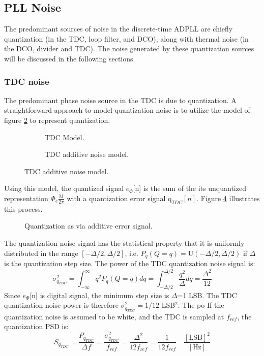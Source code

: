 \subsection{PLL Noise} \label{pn_theory}
The predominant sources of noise in the discrete-time ADPLL are chiefly quantization (in the TDC, loop filter, and DCO), along with thermal noise (in the DCO, divider and TDC). The noise generated by these quantization sources will be discussed in the following sections.

\subsubsection{TDC noise}
The predominant phase noise source in the TDC is due to quantization. A straightforward approach to model quantization noise is to utilize the model of figure \ref{fig:tdc_add_pn} to represent quantization.
\hspace{-20em}\begin{figure}[htb!]
    \centering
    \begin{subfigure}{0.5\textwidth}
        \centering
        
        \caption{TDC Model.}
        \label{fig:tdc1}
    \end{subfigure}%
    \begin{subfigure}{0.5\textwidth}
        \centering
        
        \caption{TDC additive noise model.}
        \label{fig:tdc_add_pn}
    \end{subfigure}
    \label{fig:tdc_pn_model}
\end{figure}
\FloatBarrier
Using this model, the quantized signal $e_\Phi$[n] is the sum of the its unquantized representation $\Phi_e\frac{\mathrm{M}}{2\pi}$ with a quantization error signal $\mathrm{q}_{TDC}[n]$. Figure \ref{fig:quantization} illustrates this process.
\begin{figure}[htb!]
	\center
	\caption{Quantization as via additive error signal.}
	\label{fig:quantization}
\end{figure}
\FloatBarrier
The quantization noise signal has the statistical property that it is uniformly distributed in the range $[-\Delta/2, \Delta/2]$, i.e. $P_q(Q=q) =\mathrm{U}(-\Delta/2, \Delta/2)$ if $\Delta$ is the quantization step size. The power of the TDC quantization noise signal is:
\begin{equation}\label{eq:tdc_noise}
\sigma_{q_{TDC}}^2 = \int_{-\infty}^\infty q^2P_q(Q=q)dq =  \int_{-\Delta/2}^{\Delta/2}\frac{q^2}{\Delta}dq = \frac{\Delta^2}{12}
\end{equation}
Since $e_\Phi$[n] is digital signal, the minimum step size is $\Delta$=1 LSB. The TDC quantization noise power is therefore $\sigma_{q_{TDC}}^2 = 1/12$ LSB$^2$. The po
If the quantization noise is assumed to be white, and the TDC is sampled at $f_{ref}$, the quantization PSD is:
\begin{equation}
S_{q_{TDC}} = \frac{P_{q_{TDC}}}{\Delta f} = \frac{\sigma_{q_{TDC}}^2}{f_{ref}} = \frac{\Delta^2}{12f_{ref}} = \frac{1}{12f_{ref}} \hspace{1em}\frac{[\text{LSB}]^2}{[\text{Hz}]}
\end{equation}

